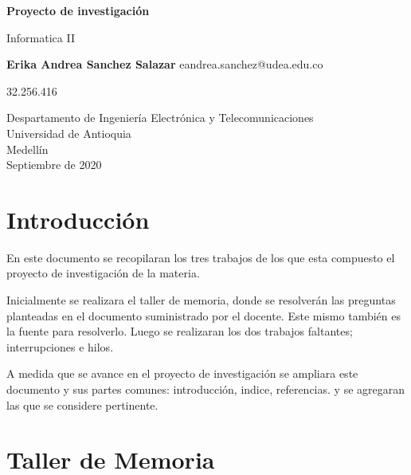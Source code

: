 \documentclass{article}
\begin{document}
\begin{titlepage}
    \begin{center}
        \vspace*{1cm}
            
        \Huge
        \textbf{Proyecto de investigación}
            
        \vspace{0.5cm}
        \LARGE
        Informatica II
            
        \vspace{1.5cm}
            
        \textbf{Erika Andrea Sanchez Salazar}
        \LARGE
         eandrea.sanchez@udea.edu.co
         
        32.256.416
        
       
            
        \vfill
            
        \vspace{0.8cm}
            
        \Large
        Despartamento de Ingeniería Electrónica y Telecomunicaciones\\
        Universidad de Antioquia\\
        Medellín\\
        Septiembre de 2020
            
    \end{center}
\end{titlepage}

\tableofcontents
\newpage
\section{Introducción}\label{intro}
En este documento se recopilaran los tres trabajos de los que esta compuesto el proyecto de investigación de la materia. 

Inicialmente se realizara el taller de memoria, donde se resolverán las preguntas planteadas en el documento suministrado por el docente. Este mismo también es la fuente para resolverlo. Luego se realizaran los dos trabajos faltantes; interrupciones e hilos.

A medida que se avance en el proyecto de investigación se ampliara este documento y sus partes comunes: introducción, indice, referencias. y se agregaran las que se considere pertinente.

\newpage
\section{Taller de Memoria} \label{contenido}
\end{document}
